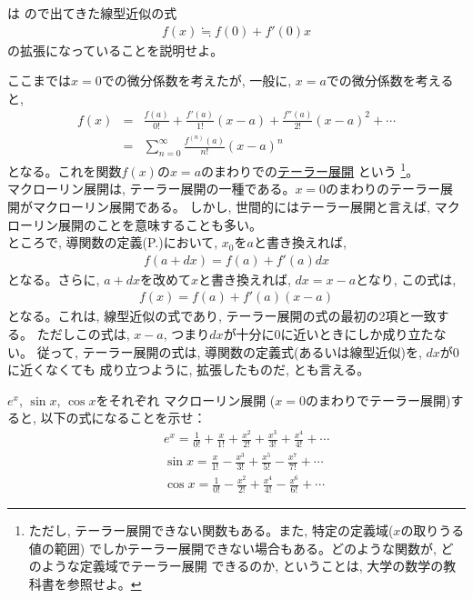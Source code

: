 \begin{q}\label{eq:Maclaurin_linear_approx} は
ので出てきた線型近似の式
\begin{eqnarray*}
f(x) \fallingdotseq f(0)+f'(0)x
\end{eqnarray*}
の拡張になっていることを説明せよ。\end{q}


ここまでは$x=0$での微分係数を考えたが, 一般に, $x=a$での微分係数を考えると, 
\begin{eqnarray}
f(x)&=& \frac{f(a)}{0!}+\frac{f'(a)}{1!} (x-a)+\frac{f''(a)}{2!} (x-a)^2+\cdots\nonumber\\
&=&\sum^{\infty}_{n=0} \frac{f^{(n)}(a)}{n!}(x-a)^n \label{eq:Taylor_expansion}
\end{eqnarray}
となる。これを関数$f(x)$の$x=a$のまわりでの\underline{テーラー展開} という
\footnote{ただし, テーラー展開できない関数もある。また, 特定の定義域($x$の取りうる値の範囲)
でしかテーラー展開できない場合もある。どのような関数が, どのような定義域でテーラー展開
できるのか, ということは, 大学の数学の教科書を参照せよ。}。\\

マクローリン展開は, テーラー展開の一種である。$x=0$のまわりのテーラー展開がマクローリン展開である。
しかし, 世間的にはテーラー展開と言えば, マクローリン展開のことを意味することも多い。\\

ところで, 導関数の定義(P.\pageref{eq:define_dif})において, $x_0$を$a$と書き換えれば, 
\begin{eqnarray}
f(a+dx)=f(a)+f'(a) dx
\end{eqnarray}
となる。さらに, $a+dx$を改めて$x$と書き換えれば, $dx=x-a$となり, この式は, 
\begin{eqnarray}
f(x)=f(a)+f'(a) (x-a)
\end{eqnarray}
となる。これは, 線型近似の式であり, テーラー展開の式の最初の2項と一致する。
ただしこの式は, $x-a$, つまり$dx$が十分に0に近いときにしか成り立たない。
従って, テーラー展開の式は, 導関数の定義式(あるいは線型近似)を, $dx$が0に近くなくても
成り立つように, 拡張したものだ, とも言える。

\begin{q}\label{q:univ_Taylor0} $e^x$, $\sin x$, $\cos x$をそれぞれ
マクローリン展開 ($x=0$のまわりでテーラー展開)すると, 以下の式になることを示せ：
\begin{eqnarray}
&&e^x = \frac{1}{0!}+\frac{x}{1!}+\frac{x^2}{2!}+\frac{x^3}{3!}+\frac{x^4}{4!}+\cdots\label{eq:Taylor_exp0}\\
&&\sin x = \frac{x}{1!}-\frac{x^3}{3!}+\frac{x^5}{5!}-\frac{x^7}{7!}+\cdots\label{eq:Taylor_sin0}\\
&&\cos x=\frac{1}{0!}-\frac{x^2}{2!}+\frac{x^4}{4!}-\frac{x^6}{6!}+\cdots\label{eq:Taylor_cos0}
\end{eqnarray}\end{q}
\vspace{0.3cm}

